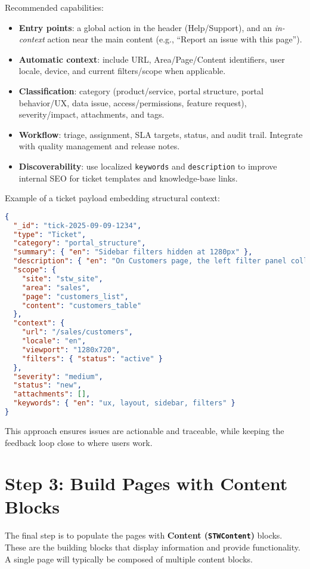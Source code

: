 Recommended capabilities:
\begin{itemize}
  \item \textbf{Entry points}: a global action in the header (Help/Support), and an \emph{in-context} action near the main content (e.g., “Report an issue with this page”).
  \item \textbf{Automatic context}: include URL, Area/Page/Content identifiers, user locale, device, and current filters/scope when applicable.
  \item \textbf{Classification}: category (product/service, portal structure, portal behavior/UX, data issue, access/permissions, feature request), severity/impact, attachments, and tags.
  \item \textbf{Workflow}: triage, assignment, SLA targets, status, and audit trail. Integrate with quality management and release notes.
  \item \textbf{Discoverability}: use localized \texttt{keywords} and \texttt{description} to improve internal SEO for ticket templates and knowledge-base links.
\end{itemize}

Example of a ticket payload embedding structural context:
\begin{lstlisting}[language=JSON,caption={Ticket with Structural Context},label={lst:ticket-structure}]
{
  "_id": "tick-2025-09-09-1234",
  "type": "Ticket",
  "category": "portal_structure",
  "summary": { "en": "Sidebar filters hidden at 1280px" },
  "description": { "en": "On Customers page, the left filter panel collapses unexpectedly at 1280px width." },
  "scope": {
    "site": "stw_site",
    "area": "sales",
    "page": "customers_list",
    "content": "customers_table"
  },
  "context": {
    "url": "/sales/customers",
    "locale": "en",
    "viewport": "1280x720",
    "filters": { "status": "active" }
  },
  "severity": "medium",
  "status": "new",
  "attachments": [],
  "keywords": { "en": "ux, layout, sidebar, filters" }
}
\end{lstlisting}

This approach ensures issues are actionable and traceable, while keeping the feedback loop close to where users work.

\section{Step 3: Build Pages with Content Blocks}
\label{sec:build-with-content}

The final step is to populate the pages with \textbf{Content (\texttt{STWContent})} blocks. These are the building blocks that display information and provide functionality. A single page will typically be composed of multiple content blocks.

